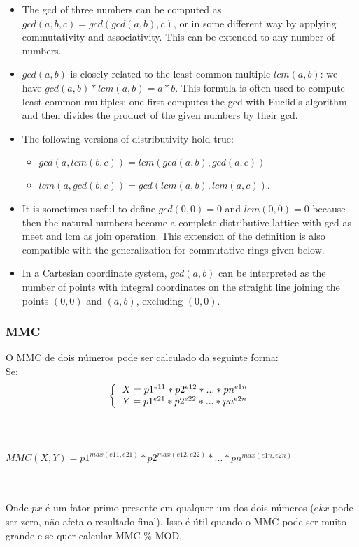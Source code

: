 \begin{itemize}
    \item The gcd of three numbers can be computed as $gcd(a, b, c) = gcd(gcd(a, b), c)$, or in some different way by applying commutativity and associativity. This can be extended to any number of numbers.
    \item $gcd(a, b)$ is closely related to the least common multiple $lcm(a, b)$: we have $gcd(a, b)*lcm(a, b) = a*b$. This formula is often used to compute least common multiples: one first computes the gcd with Euclid's algorithm and then divides the product of the given numbers by their gcd.
    \item The following versions of distributivity hold true:
    \begin{itemize}
      \item $gcd(a, lcm(b, c)) = lcm(gcd(a, b), gcd(a, c))$
      \item $lcm(a, gcd(b, c)) = gcd(lcm(a, b), lcm(a, c))$.
    \end{itemize}
    \item It is sometimes useful to define $gcd(0, 0) = 0$ and $lcm(0, 0) = 0$ because then the natural numbers become a complete distributive lattice with gcd as meet and lcm as join operation. This extension of the definition is also compatible with the generalization for commutative rings given below.
    \item In a Cartesian coordinate system, $gcd(a, b)$ can be interpreted as the number of points with integral coordinates on the straight line joining the points $(0, 0)$ and $(a, b)$, excluding $(0, 0)$.
  \end{itemize}
\divisor


\subsubsection{MMC}
O MMC de dois n\'{u}meros pode ser calculado da seguinte forma:
\\ Se:
  \[
  \left \{
  \begin{tabular}{c}
    $X=p1^{e11}*p2^{e12}*...*pn^{e1n}$ \\
    $Y=p1^{e21}*p2^{e22}*...*pn^{e2n}$
   \end{tabular}
   \right.
   \]
\\ 
\\ \centerline{$MMC(X,Y)=p1^{max(e11,e21)}*p2^{max(e12,e22)}*...*pn^{max(e1n,e2n)}$}
\\
\\ Onde $px$ \'{e} um fator primo presente em qualquer um dos dois n\'{u}meros ($ekx$ pode ser zero, n\~{a}o afeta o resultado final). Isso \'{e} \'{u}til quando o MMC pode ser muito grande e se quer calcular MMC \% MOD.

